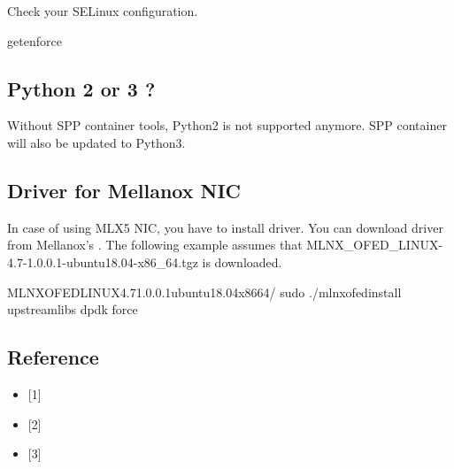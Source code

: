 \documentclass[a4paper,11pt,openany,oneside,english]{sphinxmanual}
\begin{document}
Check your SELinux configuration.

\begin{sphinxVerbatim}[commandchars=\\\{\},formatcom=\footnotesize]
 getenforce
\end{sphinxVerbatim}


\subsection{Python 2 or 3 ?}
\label{\detokenize{gsg/setup:python-2-or-3}}
Without SPP container tools, Python2 is not supported anymore.
SPP container will also be updated to Python3.


\subsection{Driver for Mellanox NIC}
\label{\detokenize{gsg/setup:driver-for-mellanox-nic}}
In case of using MLX5 NIC, you have to install driver.
You can download driver from Mellanox’s .
The following example assumes that
MLNX\_OFED\_LINUX-4.7-1.0.0.1-ubuntu18.04-x86\_64.tgz is downloaded.

\begin{sphinxVerbatim}[commandchars=\\\{\},formatcom=\footnotesize]
 MLNX\PYGZus{}OFED\PYGZus{}LINUX\PYGZhy{}4.7\PYGZhy{}1.0.0.1\PYGZhy{}ubuntu18.04\PYGZhy{}x86\PYGZus{}64/
sudo ./mlnxofedinstall \PYGZhy{}\PYGZhy{}upstream\PYGZhy{}libs \PYGZhy{}\PYGZhy{}dpdk \PYGZhy{}\PYGZhy{}force
\end{sphinxVerbatim}


\subsection{Reference}
\label{\detokenize{gsg/setup:reference}}\begin{itemize}
\item {} 
{[}1{]} 

\item {} 
{[}2{]} 

\item {} 
{[}3{]} 

\end{itemize}
\end{document}

